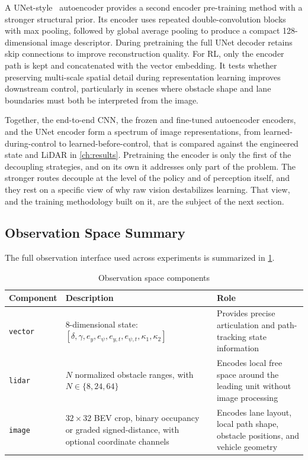 A UNet-style~\cite{ronneberger2015unet} autoencoder provides a second encoder pre-training method with a stronger structural prior. Its encoder uses repeated double-convolution blocks with max pooling, followed by global average pooling to produce a compact 128-dimensional image descriptor. During pretraining the full UNet decoder retains skip connections to improve reconstruction quality. For RL, only the encoder path is kept and concatenated with the vector embedding. It tests whether preserving multi-scale spatial detail during representation learning improves downstream control, particularly in scenes where obstacle shape and lane boundaries must both be interpreted from the image.

Together, the end-to-end CNN, the frozen and fine-tuned autoencoder encoders, and the UNet encoder form a spectrum of image representations, from learned-during-control to learned-before-control, that is compared against the engineered state and LiDAR in \cref{ch:results}. Pretraining the encoder is only the first of the decoupling strategies, and on its own it addresses only part of the problem. The stronger routes decouple at the level of the policy and of perception itself, and they rest on a specific view of why raw vision destabilizes learning. That view, and the training methodology built on it, are the subject of the next section.

\subsection{Observation Space Summary}

The full observation interface used across experiments is summarized in \cref{tab:observation_components}.

\begin{table}[H]
\centering
\caption{Observation space components}
\label{tab:observation_components}
\begin{tabular}{p{3cm} p{5cm} p{5cm}}
\toprule
Component & Description & Role \\
\midrule
\texttt{vector} & 8-dimensional state: $[\delta,\gamma,e_y,e_\psi,e_{y,t},e_{\psi,t},\kappa_1,\kappa_2]$ & Provides precise articulation and path-tracking state information \\
\texttt{lidar} & $N$ normalized obstacle ranges, with $N \in \{8,24,64\}$ & Encodes local free space around the leading unit without image processing \\
\texttt{image}  & $32 \times 32$ BEV crop, binary occupancy or graded signed-distance, with optional coordinate channels & Encodes lane layout, local path shape, obstacle positions, and vehicle geometry \\
\bottomrule
\end{tabular}
\end{table}

